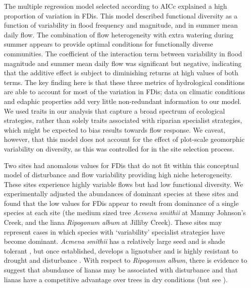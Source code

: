 \documentclass[12pt,a4paper]{memoir}
\begin{document}
The multiple regression model selected according to AICc explained a high proportion of variation in FDis. This model described functional diversity as a function of variability in flood frequency and magnitude, and in summer mean daily flow. The combination of flow heterogeneity with extra watering during summer appears to provide optimal conditions for functionally diverse communities. The coefficient of the interaction term between variability in flood magnitude and summer mean daily flow was significant but negative, indicating that the additive effect is subject to diminishing returns at high values of both terms. The key finding here is that these three metrics of hydrological conditions are able to account for most of the variation in FDis; data on climatic conditions and edaphic properties add very little non-redundant information to our model. We used traits in our analysis that capture a broad spectrum of ecological strategies, rather than solely traits associated with riparian specialist strategies, which might be expected to bias results towards flow response. We caveat, however, that this model does not account for the effect of plot-scale geomorphic variability on diversity, as this was controlled for in the site selection process.
 
Two sites had anomalous values for FDis that do not fit within this conceptual model of disturbance and flow variability providing high niche heterogeneity. These sites experience highly variable flows but had low functional diversity. We experimentally adjusted the abundances of dominant species at these sites and found that the low values for FDis appear to result from dominance of a single species at each site (the medium sized tree \textit{Acmena smithii} at Mammy Johnson’s Creek, and the liana \textit{Ripogonum album} at Jilliby Creek). These sites may represent cases in which species with ‘variability’ specialist strategies have become dominant. \textit{Acmena smithii} has a relatively large seed and is shade tolerant \citep{Melick1990}, but once established, develops a lignotuber and is highly resistant to drought and disturbance \citep{Ashton1976}. With respect to \textit{Ripogonum album}, there is evidence to suggest that abundance of lianas may be associated with disturbance \citep{Laurance2001} and that lianas have a competitive advantage over trees in dry conditions \citep{Swaine2007, Cai2009} (but see \citet{Nepstad2007}).
 
\end{document}
